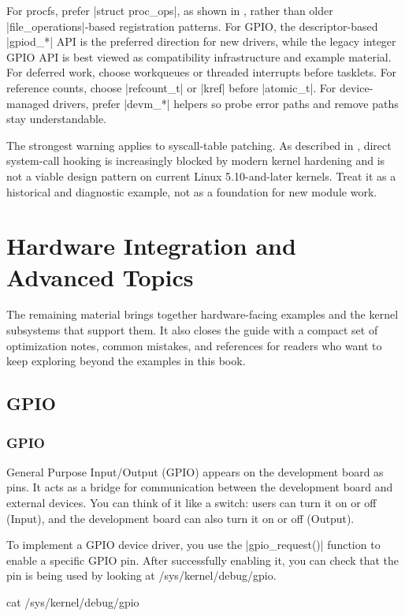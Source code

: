 \documentclass[10pt, oneside]{book}
\begin{document}
For procfs, prefer \cpp|struct proc_ops|, as shown in
, rather than older \cpp|file_operations|-based
registration patterns.
For GPIO, the descriptor-based \cpp|gpiod_*| API is the preferred direction for
new drivers, while the legacy integer GPIO API is best viewed as compatibility
infrastructure and example material.
For deferred work, choose workqueues or threaded interrupts before tasklets.
For reference counts, choose \cpp|refcount_t| or \cpp|kref| before \cpp|atomic_t|.
For device-managed drivers, prefer \cpp|devm_*| helpers so probe error paths and
remove paths stay understandable.

The strongest warning applies to syscall-table patching.
As described in , direct system-call hooking is increasingly
blocked by modern kernel hardening and is not a viable design pattern on current
Linux 5.10-and-later kernels.
Treat it as a historical and diagnostic example, not as a foundation for new
module work.

\chapter{Hardware Integration and Advanced Topics}
The remaining material brings together hardware-facing examples and the kernel
subsystems that support them. It also closes the guide with a compact set of
optimization notes, common mistakes, and references for readers who want to
keep exploring beyond the examples in this book.

\section{GPIO}
\label{sec:gpio}
\subsection{GPIO}
\label{sec:gpio_introduction}
General Purpose Input/Output (GPIO) appears on the development board as pins.
It acts as a bridge for communication between the development board and external devices.
You can think of it like a switch: users can turn it on or off (Input), and the development board can also turn it on or off (Output).

To implement a GPIO device driver, you use the \cpp|gpio_request()| function to enable a specific GPIO pin.
After successfully enabling it, you can check that the pin is being used by looking at /sys/kernel/debug/gpio.

\begin{codebash}
cat /sys/kernel/debug/gpio
\end{codebash}
\end{document}
